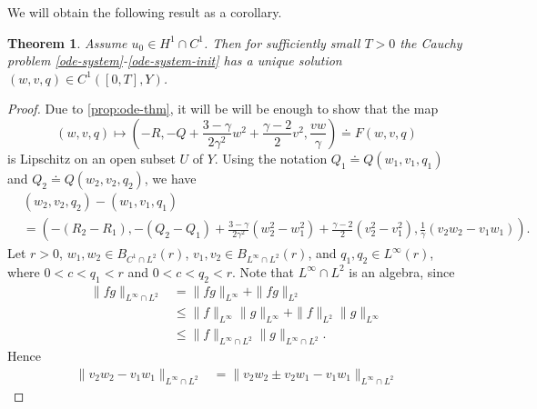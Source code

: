 \documentclass[12pt,reqno]{amsart}
\numberwithin{equation}{section}  %
\numberwithin{figure}{section}
\newtheorem{theorem}{Theorem}[section]
\begin{document}
We will obtain the following result as a corollary. 
%
%
%
%
%
%
%
%
\begin{theorem}
  Assume $u_{0} \in H^{1} \cap C^{1}$. Then for sufficiently small $T > 0$
the Cauchy problem \eqref{ode-system}-\eqref{ode-system-init} has a unique
solution $(w, v, q) \in C^{1}([0, T], Y)$.
\label{thm:ode-sys-sol}
\end{theorem}
%
%
\begin{proof}
  Due to \eqref{prop:ode-thm}, it will
  be will be enough to show that the map $$(w, v, q) \mapsto
\left ( -R, -Q + \frac{3 - \gamma}{2 \gamma^{2}}w^{2} + \frac{\gamma
-2}{2}v^{2}, \frac{vw}{\gamma} \right ) \doteq F(w, v, q)$$ is Lipschitz on
an open subset $U$ of $Y$. 
%
Using the notation $Q_{1} \doteq Q(w_{1}, v_{1}, q_{1})$ and $Q_{2} \doteq
Q(w_{2}, v_{2}, q_{2})$, we have
%
%
\begin{equation}
  \label{lip-diff}
\begin{split}
  & (w_{2}, v_{2}, q_{2}) - (w_{1}, v_{1}, q_{1})
  \\
  & = \left( -(R_{2} - R_{1}),
  -(Q_{2} - Q_{1}) + \frac{3 - \gamma}{2 \gamma^{2}}(w_{2}^{2} -
  w_{1}^{2}) + \frac{\gamma -2}{2} (v_{2}^{2} - v_{1}^{2}),
  \frac{1}{\gamma}(v_{2} w_{2} - v_{1} w_{1}) \right).
\end{split}
\end{equation}
%
Let $r>0$, $w_{1}, w_{2} \in B_{C^{1} \cap L^{2}}(r)$, $v_{1}, v_{2} \in B_{L^{\infty} \cap L^{2}}(r)$, and
$q_{1}, q_{2} \in L^{\infty}(r)$, where $0 < c < q_{1} < r$ and $0 < c < q_{2} <r$.
Note that $L^{\infty} \cap L^{2}$ is an algebra, since
%
%
\begin{equation*}
\begin{split}
  \| fg \|_{L^{\infty} \cap L^{2}} & = \| fg \|_{L^{\infty}} + \| fg \|_{L^{2}}
  \\
  & \le \| f \|_{L^{\infty}} \| g \|_{L^{\infty}} + \| f \|_{L^{2}}\| g \|_{L^{\infty}}
  \\
  & \le \| f \|_{L^{\infty} \cap L^{2}} \| g \|_{L^{\infty} \cap L^{2}}.
\end{split}
\end{equation*}
%
%
Hence
%
%
%
\begin{equation}
  \label{1aa}
\begin{split}
  \| v_{2}w_{2} - v_{1}w_{1} \|_{L^{\infty} \cap L^{2}}
  & = \| v_{2}w_{2} \pm v_{2}w_{1} - v_{1}w_{1} \|_{L^{\infty} \cap L^{2}}

\end{split}
\end{equation}
\end{proof}
\end{document}
